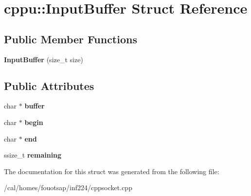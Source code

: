 \hypertarget{structcppu_1_1_input_buffer}{\section{cppu\+:\+:Input\+Buffer Struct Reference}
\label{structcppu_1_1_input_buffer}
}
\subsection*{Public Member Functions}
\begin{DoxyCompactItemize}
\item 
\hypertarget{structcppu_1_1_input_buffer_ac50e17e3cfb76a2983e5e3d4558b8144}{{\bfseries Input\+Buffer} (size\+\_\+t size)}\label{structcppu_1_1_input_buffer_ac50e17e3cfb76a2983e5e3d4558b8144}

\end{DoxyCompactItemize}
\subsection*{Public Attributes}
\begin{DoxyCompactItemize}
\item 
\hypertarget{structcppu_1_1_input_buffer_a85138068e2e10731e46784b1552bc354}{char $\ast$ {\bfseries buffer}}\label{structcppu_1_1_input_buffer_a85138068e2e10731e46784b1552bc354}

\item 
\hypertarget{structcppu_1_1_input_buffer_adbd6fb30fe51a192c9bbba6333016f31}{char $\ast$ {\bfseries begin}}\label{structcppu_1_1_input_buffer_adbd6fb30fe51a192c9bbba6333016f31}

\item 
\hypertarget{structcppu_1_1_input_buffer_ac9fb4f51a6db191e71976fcda20237c0}{char $\ast$ {\bfseries end}}\label{structcppu_1_1_input_buffer_ac9fb4f51a6db191e71976fcda20237c0}

\item 
\hypertarget{structcppu_1_1_input_buffer_a646b547733665524fa8b5de6b093ab11}{ssize\+\_\+t {\bfseries remaining}}\label{structcppu_1_1_input_buffer_a646b547733665524fa8b5de6b093ab11}

\end{DoxyCompactItemize}


The documentation for this struct was generated from the following file\+:\begin{DoxyCompactItemize}
\item 
/cal/homes/fouotsap/inf224/cppsocket.\+cpp\end{DoxyCompactItemize}
